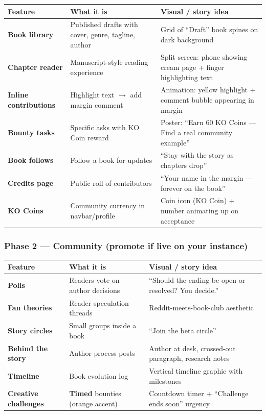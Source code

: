 \documentclass[11pt,a4paper]{report}
\begin{document}
\begin{longtable}{|l|l|l|}
\hline
Feature & What it is & Visual / story idea \\ \hline
\textbf{Book library} & Published drafts with cover, genre, tagline, author & Grid of “Draft” book spines on dark background \\ \hline
\textbf{Chapter reader} & Manuscript-style reading experience & Split screen: phone showing cream page + finger highlighting text \\ \hline
\textbf{Inline contributions} & Highlight text $\rightarrow$ add margin comment & Animation: yellow highlight + comment bubble appearing in margin \\ \hline
\textbf{Bounty tasks} & Specific asks with KO Coin reward & Poster: “Earn 60 KO Coins --- Find a real community example” \\ \hline
\textbf{Book follows} & Follow a book for updates & “Stay with the story as chapters drop” \\ \hline
\textbf{Credits page} & Public roll of contributors & “Your name in the margin --- forever on the book” \\ \hline
\textbf{KO Coins} & Community currency in navbar/profile & Coin icon (KO Coin) + number animating up on acceptance \\
\hline
\end{longtable}


\subsubsection{Phase 2 --- Community (promote if live on your instance)}

\begin{longtable}{|l|l|l|}
\hline
Feature & What it is & Visual / story idea \\ \hline
\textbf{Polls} & Readers vote on author decisions & “Should the ending be open or resolved? You decide.” \\ \hline
\textbf{Fan theories} & Reader speculation threads & Reddit-meets-book-club aesthetic \\ \hline
\textbf{Story circles} & Small groups inside a book & “Join the beta circle” \\ \hline
\textbf{Behind the story} & Author process posts & Author at desk, crossed-out paragraph, research notes \\ \hline
\textbf{Timeline} & Book evolution log & Vertical timeline graphic with milestones \\ \hline
\textbf{Creative challenges} & \textbf{Timed} bounties (orange accent) & Countdown timer + “Challenge ends soon” urgency \\
\hline
\end{longtable}
\end{document}
